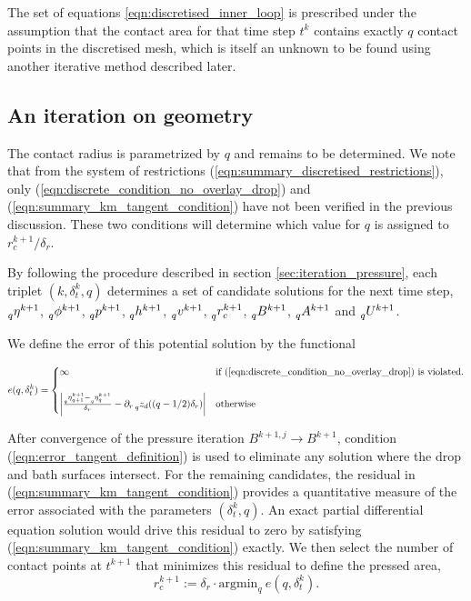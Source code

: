 \documentclass{jfm}
\begin{document}
The set of equations  \ref{eqn:discretised_inner_loop} is prescribed under the assumption that the contact area for that time step $t^k$ contains exactly $q$ contact points in the discretised mesh, which is itself an unknown to be found using another iterative method described later. 

\subsection{An iteration on geometry}

The contact radius is parametrized by \(q\) and remains to be determined. We note that from the system of restrictions (\ref{eqn:summary_discretised_restrictions}), only (\ref{eqn:discrete_condition_no_overlay_drop}) and (\ref{eqn:summary_km_tangent_condition}) have not been verified in the previous discussion. These two conditions will determine which value for $q$ is assigned to $r^{k+1}_c/\delta_r$.

\newcommand{\preq}[1]{\prescript{}{q}{#1}}
By following the procedure described in section \ref{sec:iteration_pressure}, each triplet $(k, \delta_t^k, q)$ determines a set of candidate solutions for the next time step, $\preq{\eta^{k+1}}$, $\preq{\phi^{k+1}}$, $\preq{p^{k+1}}$, $\preq{h^{k+1}}$, $\preq{v^{k+1}}$, $\preq{r^{k+1}_{c}}$, $\preq{B^{k+1}}$, $\preq{A^{k+1}}$ and $\preq{U^{k+1}}$. 

We define the error of this potential solution by the functional

\begin{equation}
    \label{eqn:error_tangent_definition}
    e(q, \delta_t^k) =
    \begin{cases}
        \infty & \text{if (\ref{eqn:discrete_condition_no_overlay_drop}) is violated.} \\ \\
             \left|\frac{\preq{\eta^{k+1}_{q+1}}-\preq{\eta^{k+1}_{q}}}{\delta_r} - \partial_r \preq{z_d}((q-1/2)\delta_r)\right| & \text{otherwise}        
    \end{cases}
\end{equation}

 After convergence of the pressure iteration $B^{k+1,j}\to B^{k+1}$, condition (\ref{eqn:error_tangent_definition}) is used to eliminate any solution where the drop and bath surfaces intersect. For the remaining candidates, the residual in (\ref{eqn:summary_km_tangent_condition}) provides a quantitative measure of the error associated with the parameters $(\delta_t^k, q)$. An exact partial differential equation solution would drive this residual to zero by satisfying (\ref{eqn:summary_km_tangent_condition}) exactly. We then select the number of contact points at $t^{k+1}$ that minimizes this residual to define the pressed area,
\begin{equation}
    r^{k+1}_c := \delta_r \cdot \text{argmin}_q \ e(q, \delta_t^k).
\end{equation}
\end{document}
